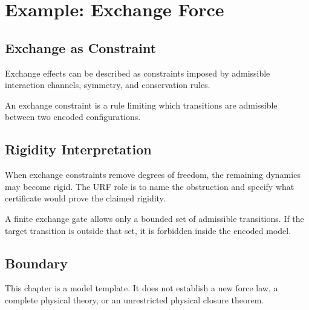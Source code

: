 \chapter{Example: Exchange Force}

\section{Exchange as Constraint}

Exchange effects can be described as constraints imposed by admissible interaction channels, symmetry, and conservation rules.

\begin{definition}
An exchange constraint is a rule limiting which transitions are admissible between two encoded configurations.
\end{definition}

\section{Rigidity Interpretation}

When exchange constraints remove degrees of freedom, the remaining dynamics may become rigid.  The URF role is to name the obstruction and specify what certificate would prove the claimed rigidity.

\begin{example}
A finite exchange gate allows only a bounded set of admissible transitions.  If the target transition is outside that set, it is forbidden inside the encoded model.
\end{example}

\section{Boundary}

This chapter is a model template.  It does not establish a new force law, a complete physical theory, or an unrestricted physical closure theorem.
